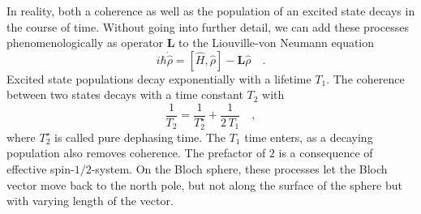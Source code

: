 In reality, both a coherence as well as the population of an excited state decays in the course of time. Without going into further detail, we can add these processes phenomenologically as operator $\boldsymbol{L}$ to the Liouville-von Neumann equation
\begin{equation}
    i\hbar \dot{\hat{\rho}} =
    [\hat{H},\hat{\rho}] - \boldsymbol{L}  \hat{\rho} \quad .
\end{equation}
Excited state populations decay exponentially with a lifetime $T_1$. The coherence between two states decays with a time constant $T_2$ with
\begin{equation}
    \frac{1}{T_2} = \frac{1}{T_2^\star} + \frac{1}{2 \, T_1} \quad ,
\end{equation}
where $T_2^\star$ is called pure dephasing time. The $T_1$ time enters, as a decaying population also removes coherence. The prefactor of $2$ is a consequence of effective spin-$1/2$-system. On the Bloch sphere, these processes let the Bloch vector move back to the north pole, but not along the surface of the sphere but with varying length of the vector.



\printbibliography[segment=\therefsegment,heading=subbibliography]
